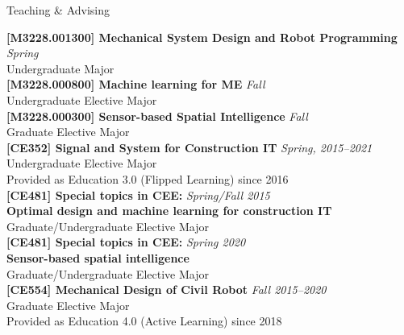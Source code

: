 \begin{rSection}{Teaching \& Advising}

{\bf[M3228.001300] Mechanical System Design and Robot Programming} \hfill {\em Spring} \\
Undergraduate Major \\

{\bf[M3228.000800] Machine learning for ME} \hfill {\em Fall} \\
Undergraduate Elective Major \\

{\bf[M3228.000300] Sensor-based Spatial Intelligence} \hfill {\em Fall} \\
Graduate Elective Major \\

{\bf[CE352] Signal and System for Construction IT} \hfill {\em Spring, 2015--2021} \\
Undergraduate Elective Major \\
Provided as Education 3.0 (Flipped Learning) since 2016\\

{\bf[CE481] Special topics in CEE:} \hfill {\em Spring/Fall 2015} \\
{\bf Optimal design and machine learning for construction IT}\\
Graduate/Undergraduate Elective Major \\

{\bf[CE481] Special topics in CEE:} \hfill {\em Spring 2020} \\
{\bf Sensor-based spatial intelligence}\\
Graduate/Undergraduate Elective Major \\

{\bf[CE554] Mechanical Design of Civil Robot } \hfill {\em Fall 2015--2020} \\
Graduate Elective Major \\
Provided as Education 4.0 (Active Learning) since 2018\\


\end{rSection}
